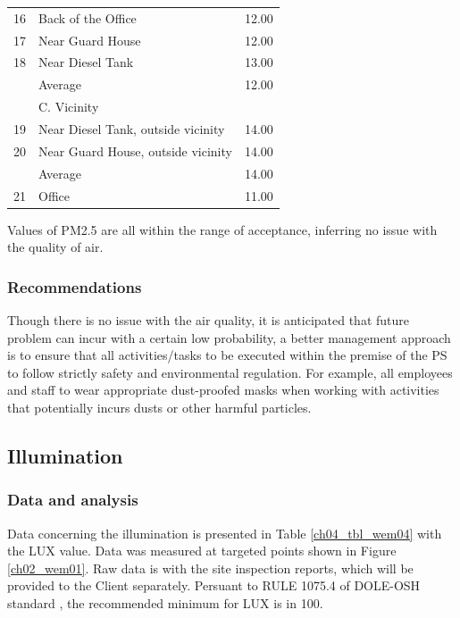 \begin{table}[h]
{\begin{tabular}{c|l|c}
	16 & Back of the Office & 12.00 \\ 
	17 & Near Guard House & 12.00 \\ 
	18 & Near Diesel Tank & 13.00 \\ 
	& Average & 12.00 \\ 
	\hline
	& C. Vicinity &  \\ 
	19 & Near Diesel Tank, outside vicinity & 14.00 \\ 
	20 & Near Guard House, outside vicinity & 14.00 \\ 
	& Average & 14.00 \\ 
	\hline
	21 & Office & 11.00 \\ 
	\hline
\end{tabular}
	}
\end{table}

Values of PM2.5 are all within the range of acceptance, inferring no issue with the quality of air. 


\subsubsection{Recommendations}
Though there is no issue with the air quality, it is anticipated that future problem can incur with a certain low probability, a better management approach is to ensure that all activities/tasks to be executed within the premise of the PS to follow strictly safety and environmental regulation. For example, all employees and staff to wear appropriate dust-proofed masks when working with activities that potentially incurs dusts or other harmful particles.

\subsection{Illumination}\label{aq03}
\subsubsection{Data and analysis}
Data concerning the illumination is presented in Table \ref{ch04_tbl_wem04} with the LUX value. Data was measured at targeted points shown in Figure \ref{ch02_wem01}. Raw data is with the site inspection reports, which will be provided to the Client separately. Persuant to RULE 1075.4 of DOLE-OSH standard \cite{DOLE2016}, the recommended minimum for LUX is in 100.

